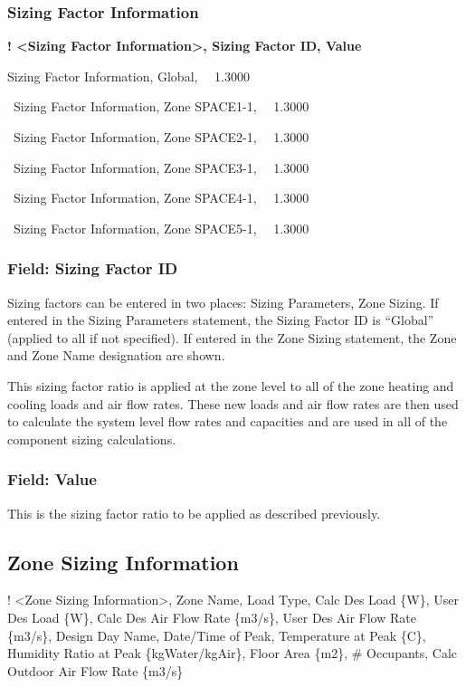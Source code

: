 \subsubsection{Sizing Factor Information}\label{sizing-factor-information}

\textbf{! \textless{}Sizing Factor Information\textgreater{}, Sizing Factor ID, Value}

Sizing Factor Information, Global,~~ 1.3000

~Sizing Factor Information, Zone SPACE1-1,~~ 1.3000

~Sizing Factor Information, Zone SPACE2-1,~~ 1.3000

~Sizing Factor Information, Zone SPACE3-1,~~ 1.3000

~Sizing Factor Information, Zone SPACE4-1,~~ 1.3000

~Sizing Factor Information, Zone SPACE5-1,~~ 1.3000

\subsubsection{Field: Sizing Factor ID}\label{field-sizing-factor-id}

Sizing factors can be entered in two places: Sizing Parameters, Zone Sizing. If entered in the Sizing Parameters statement, the Sizing Factor ID is ``Global'' (applied to all if not specified). If entered in the Zone Sizing statement, the Zone and Zone Name designation are shown.

This sizing factor ratio is applied at the zone level to all of the zone heating and cooling loads and air flow rates. These new loads and air flow rates are then used to calculate the system level flow rates and capacities and are used in all of the component sizing calculations.

\subsubsection{Field: Value}\label{field-value}

This is the sizing factor ratio to be applied as described previously.

\subsection{Zone Sizing Information}\label{zone-sizing-information}

! \textless{}Zone Sizing Information\textgreater{}, Zone Name, Load Type, Calc Des Load \{W\}, User Des Load \{W\}, Calc Des Air Flow Rate \{m3/s\}, User Des Air Flow Rate \{m3/s\}, Design Day Name, Date/Time of Peak, Temperature at Peak \{C\}, Humidity Ratio at Peak \{kgWater/kgAir\}, Floor Area \{m2\}, \# Occupants, Calc Outdoor Air Flow Rate \{m3/s\}

